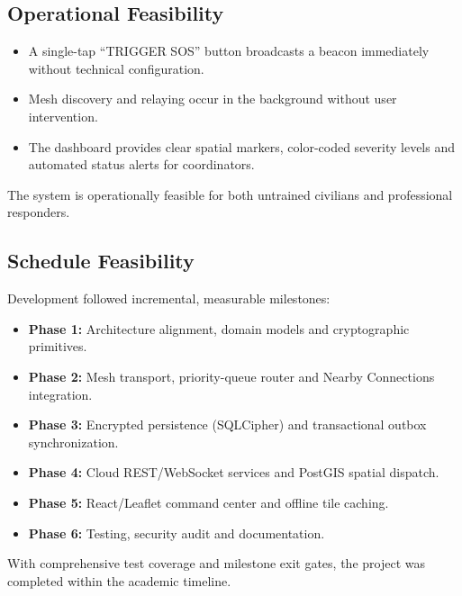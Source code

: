 \documentclass[12pt,a4paper]{report}
\begin{document}
\subsection{Operational Feasibility}
\begin{itemize}
    \item A single-tap ``TRIGGER SOS'' button broadcasts a beacon immediately without technical configuration.
    \item Mesh discovery and relaying occur in the background without user intervention.
    \item The dashboard provides clear spatial markers, color-coded severity levels and automated status alerts for coordinators.
\end{itemize}
The system is operationally feasible for both untrained civilians and professional responders.

\subsection{Schedule Feasibility}
Development followed incremental, measurable milestones:
\begin{itemize}
    \item \textbf{Phase 1:} Architecture alignment, domain models and cryptographic primitives.
    \item \textbf{Phase 2:} Mesh transport, priority-queue router and Nearby Connections integration.
    \item \textbf{Phase 3:} Encrypted persistence (SQLCipher) and transactional outbox synchronization.
    \item \textbf{Phase 4:} Cloud REST/WebSocket services and PostGIS spatial dispatch.
    \item \textbf{Phase 5:} React/Leaflet command center and offline tile caching.
    \item \textbf{Phase 6:} Testing, security audit and documentation.
\end{itemize}
With comprehensive test coverage and milestone exit gates, the project was completed within the academic timeline.
\end{document}

